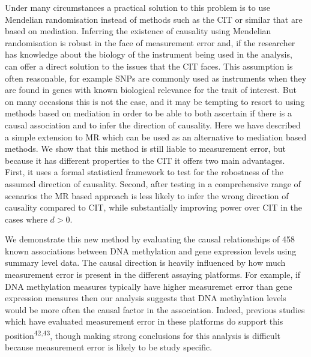 \documentclass[]{article}
\begin{document}
Under many circumstances a practical solution to this problem is to use
Mendelian randomisation instead of methods such as the CIT or similar
that are based on mediation. Inferring the existence of causality using
Mendelian randomisation is robust in the face of measurement error and,
if the researcher has knowledge about the biology of the instrument
being used in the analysis, can offer a direct solution to the issues
that the CIT faces. This assumption is often reasonable, for example
SNPs are commonly used as instruments when they are found in genes with
known biological relevance for the trait of interest. But on many
occasions this is not the case, and it may be tempting to resort to
using methods based on mediation in order to be able to both ascertain
if there is a causal association and to infer the direction of
causality. Here we have described a simple extension to MR which can be
used as an alternative to mediation based methods. We show that this
method is still liable to measurement error, but because it has
different properties to the CIT it offers two main advantages. First, it
uses a formal statistical framework to test for the robostness of the
assumed direction of causality. Second, after testing in a comprehensive
range of scenarios the MR based approach is less likely to infer the
wrong direction of causality compared to CIT, while substantially
improving power over CIT in the cases where \(d > 0\).

We demonstrate this new method by evaluating the causal relationships of
458 known associations between DNA methylation and gene expression
levels using summary level data. The causal direction is heavily
influenced by how much measurement error is present in the different
assaying platforms. For example, if DNA methylation measures typically
have higher measuremet error than gene expression measures then our
analysis suggests that DNA methylation levels would be more often the
causal factor in the association. Indeed, previous studies which have
evaluated measurement error in these platforms do support this
position\textsuperscript{42,43}, though making strong conclusions for
this analysis is difficult because measurement error is likely to be
study specific.
\end{document}
